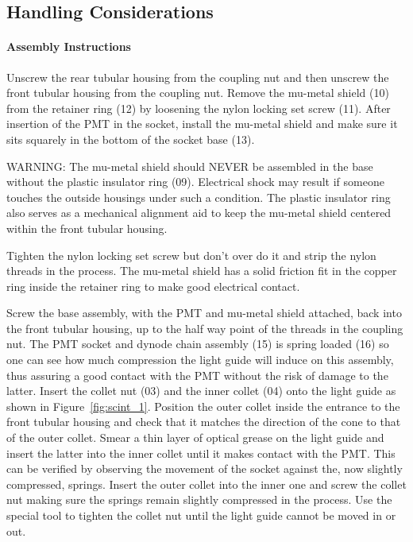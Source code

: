 \subsection{Handling Considerations}

\paragraph{Assembly Instructions}

   Unscrew the rear tubular housing from the coupling nut and then unscrew the
front tubular housing from the coupling nut.  Remove the mu-metal
shield (10) from the retainer ring (12) by loosening the nylon locking set screw
(11). After insertion of the PMT in the socket, install the mu-metal shield and
make sure it sits squarely in the bottom of the socket base (13). 

WARNING: The mu-metal shield should NEVER be assembled in the base without the 
plastic insulator ring (09). Electrical shock may result if someone touches the 
outside housings under such a condition. The plastic insulator ring also serves 
as a mechanical alignment aid to keep the mu-metal shield centered within the 
front tubular housing.

Tighten the nylon locking set screw but don't over do it and strip the nylon
threads in the process. The mu-metal shield has a solid friction fit in the
copper ring inside the retainer ring to make good electrical contact. 

Screw the base assembly, with the PMT and mu-metal shield attached, back into
the front tubular housing, up to the half way point of the threads in the
coupling nut. The PMT socket and dynode chain assembly (15) is spring loaded
(16) so one can see how much compression the light guide will induce on this
assembly, thus assuring a good contact with the PMT without the risk of damage
to the latter. Insert the collet nut (03) and the inner collet (04) onto the
light guide as shown in Figure~\ref{fig:scint_1}. Position the outer collet inside the entrance
to the front tubular housing and check that it matches the direction of the
cone to that of the outer collet. Smear a thin layer of optical grease on the
light guide and insert the latter into the inner collet until it makes contact
with the PMT. This can be verified by observing the movement of the socket
against the, now slightly compressed, springs. Insert the outer collet into the
inner one and screw the collet nut making sure the springs remain slightly
compressed in the process. Use the special tool to tighten the collet nut until
the light guide cannot be moved in or out. 

